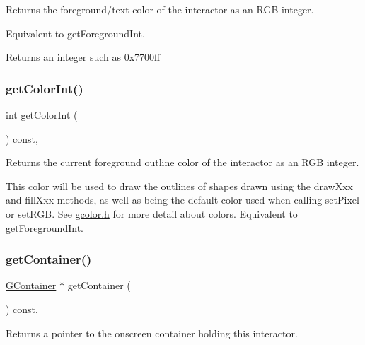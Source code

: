 Returns the foreground/text color of the interactor as an R\+GB integer. 

Equivalent to get\+Foreground\+Int. \begin{DoxyReturn}{Returns}
an integer such as 0x7700ff 
\end{DoxyReturn}
\mbox{\label{classGDrawingSurface_a9635c7af766cdc3417f346683fa0e6c1}} 
\subsubsection{\texorpdfstring{get\+Color\+Int()}{getColorInt()}\hspace{0.1cm}{\footnotesize\ttfamily [2/2]}}
{\footnotesize\ttfamily int get\+Color\+Int (\begin{DoxyParamCaption}{ }\end{DoxyParamCaption}) const\hspace{0.3cm}{\ttfamily [virtual]}, {\ttfamily [inherited]}}



Returns the current foreground outline color of the interactor as an R\+GB integer. 

This color will be used to draw the outlines of shapes drawn using the draw\+Xxx and fill\+Xxx methods, as well as being the default color used when calling set\+Pixel or set\+R\+GB. See \mbox{\hyperlink{gcolor_8h_source}{gcolor.\+h}} for more detail about colors. Equivalent to get\+Foreground\+Int. \mbox{\label{classGInteractor_a7a6e317c29d61030929b4cd2d1c00fe7}} 
\subsubsection{\texorpdfstring{get\+Container()}{getContainer()}}
{\footnotesize\ttfamily \mbox{\hyperlink{classGContainer}{G\+Container}} $\ast$ get\+Container (\begin{DoxyParamCaption}{ }\end{DoxyParamCaption}) const\hspace{0.3cm}{\ttfamily [virtual]}, {\ttfamily [inherited]}}



Returns a pointer to the onscreen container holding this interactor. 

